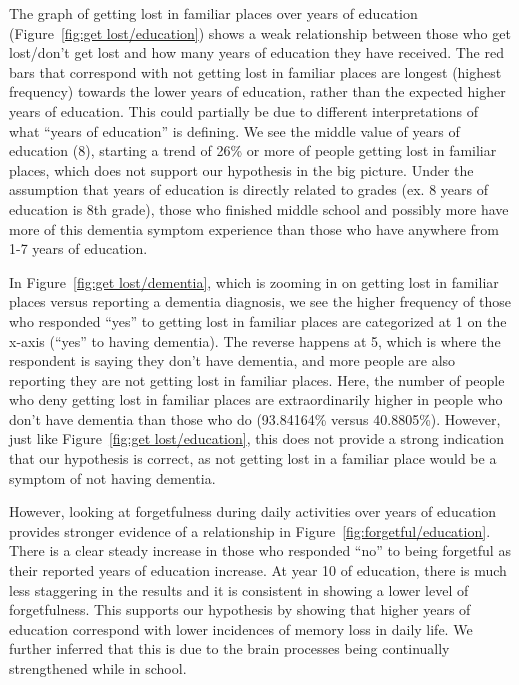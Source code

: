\documentclass{article}
\begin{document}
\hspace*{1em} The graph of getting lost in familiar places over years of education (Figure~\ref{fig:get lost/education}) shows a weak relationship between those who get lost/don’t get lost and how many years of education they have received. The red bars that correspond with not getting lost in familiar places are longest (highest frequency) towards the lower years of education, rather than the expected higher years of education. This could partially be due to different interpretations of what “years of education” is defining. We see the middle value of years of education (8), starting a trend of 26\% or more of people getting lost in familiar places, which does not support our hypothesis in the big picture. Under the assumption that years of education is directly related to grades (ex. 8 years of education is 8th grade), those who finished middle school and possibly more have more of this dementia symptom experience than those who have anywhere from 1-7 years of education.

\hspace*{1em} In Figure~\ref{fig:get lost/dementia}, which is zooming in on getting lost in familiar places versus reporting a dementia diagnosis, we see the higher frequency of those who responded “yes” to getting lost in familiar places are categorized at 1 on the x-axis (“yes” to having dementia). The reverse happens at 5, which is where the respondent is saying they don’t have dementia, and more people are also reporting they are not getting lost in familiar places. Here, the number of people who deny getting lost in familiar places are extraordinarily higher in people who don’t have dementia than those who do (93.84164\% versus 40.8805\%). However, just like Figure~\ref{fig:get lost/education}, this does not provide a strong indication that our hypothesis is correct, as not getting lost in a familiar place would be a symptom of not having dementia. 

\hspace*{1em} However, looking at forgetfulness during daily activities over years of education provides stronger evidence of a relationship in Figure~\ref{fig:forgetful/education}. There is a clear steady increase in those who responded “no” to being forgetful as their reported years of education increase. At year 10 of education, there is much less staggering in the results and it is consistent in showing a lower level of forgetfulness. This supports our hypothesis by showing that higher years of education correspond with lower incidences of memory loss in daily life. We further inferred that this is due to the brain processes being continually strengthened while in school. 
\end{document}
